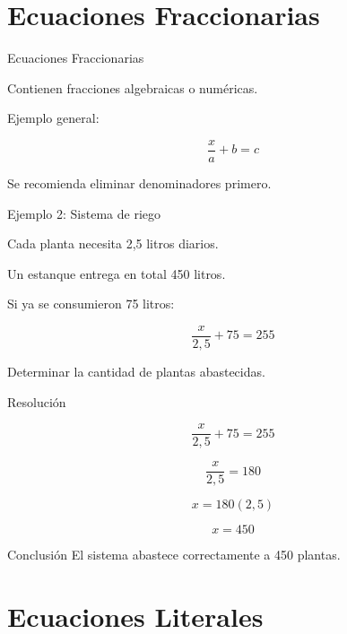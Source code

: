 \documentclass[handout,aspectratio=169]{beamer}
\begin{document}
	\section{Ecuaciones Fraccionarias}
	
	\begin{frame}{Ecuaciones Fraccionarias}
		
		Contienen fracciones algebraicas o numéricas.
		
		Ejemplo general:
		
		\[
		\frac{x}{a} + b = c
		\]
		
		Se recomienda eliminar denominadores primero.
		
	\end{frame}
	
	\begin{frame}{Ejemplo 2: Sistema de riego}
		
		Cada planta necesita 2,5 litros diarios.
		
		Un estanque entrega en total 450 litros.
		
		Si ya se consumieron 75 litros:
		
		\[
		\frac{x}{2,5} + 75 = 255
		\]
		
		Determinar la cantidad de plantas abastecidas.
		
	\end{frame}
	
	\begin{frame}{Resolución}
		
		\[
		\frac{x}{2,5} + 75 = 255
		\]
		
		\pause
		
		\[
		\frac{x}{2,5} = 180
		\]
		
		\pause
		
		\[
		x = 180(2,5)
		\]
		
		\pause
		
		\[
		x = 450
		\]
		
		\begin{block}{Conclusión}
			El sistema abastece correctamente a 450 plantas.
		\end{block}
		
	\end{frame}
	
	\section{Ecuaciones Literales}
	
\end{document}
